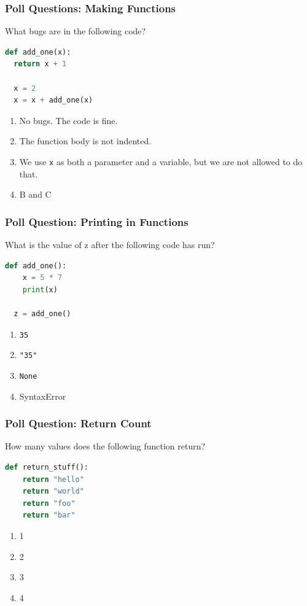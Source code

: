 \documentclass{beamer}
\begin{document}
%
%
\begin{frame}[fragile]
  \frametitle{Poll Questions: Making Functions}
  What bugs are in the following code?
  \begin{lstlisting}[language=Python, autogobble]
  def add_one(x):
  return x + 1

  x = 2
  x = x + add_one(x)
  \end{lstlisting}
  \vfill
  \begin{enumerate}[A]
    \item No bugs. The code is fine.
    \item The function body is not indented.
    \item We use \lstinline|x| as both a parameter and a variable, but we are not allowed to do that.
    \item B and C
  \end{enumerate}
\end{frame}

%
%
\begin{frame}[fragile]
  \frametitle{Poll Question: Printing in Functions} 
  What is the value of z after the following code has run?
  \begin{lstlisting}[language=Python, autogobble]
  def add_one():
    x = 5 * 7
    print(x)

  z = add_one()
  \end{lstlisting}
  \vfill
  \begin{enumerate}[A]
    \item \lstinline|35|
    \item \lstinline|"35"|
    \item \lstinline|None|
    \item SyntaxError
  \end{enumerate}
\end{frame}

%
%
\begin{frame}[fragile]
  \frametitle{Poll Question: Return Count} 
  How many values does the following function return?
  \begin{lstlisting}[language=Python, autogobble]
  def return_stuff():
    return "hello"
    return "world"
    return "foo"
    return "bar"
  \end{lstlisting}
  \vfill
  \begin{enumerate}[A]
    \item 1
    \item 2
    \item 3
    \item 4
  \end{enumerate}
\end{frame}
\end{document}
